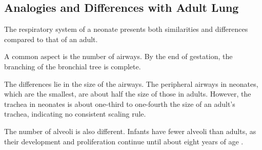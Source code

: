 





\subsection{Analogies and Differences with Adult Lung}
\label{subsec:analogies_and_differences}

The respiratory system of a neonate presents both similarities and
differences compared to that of an adult.

A common aspect is the number of airways. By the end of gestation, the
branching of the bronchial tree is complete.

The differences lie in the size of the airways. The peripheral airways
in neonates, which are the smallest, are about half the size of those
in adults. However, the trachea in neonates is about one-third to
one-fourth the size of an adult's trachea, indicating no consistent
scaling rule.

The number of alveoli is also different. Infants have fewer alveoli
than adults, as their development and proliferation continue until
about eight years of age \cite{avery1973}.

